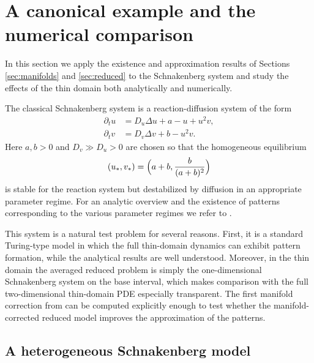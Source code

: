 \documentclass[11pt]{article}
\theoremstyle{definition}
\theoremstyle{remark}
\numberwithin{equation}{section}
\begin{document}
\section{A canonical example and the numerical comparison}\label{sec:example}

In this section we apply the existence and approximation results of Sections \ref{sec:manifolds} and \ref{sec:reduced} to the Schnakenberg system and study the effects of the thin domain both analytically and numerically.

The classical Schnakenberg system \cite{schnakenberg1979simple,maini1997spatial} is a reaction-diffusion system of the form 
\begin{equation}\label{eq:schnak}
\begin{aligned}
\partial_t u &= D_u\Delta u + a-u+u^2v,\\
\partial_t v &= D_v\Delta v + b-u^2v.
\end{aligned}
\end{equation}
Here $a,b>0$ and $D_v\gg D_u>0$ are chosen so that the homogeneous equilibrium
\[
(u_*,v_*)=\Bigl(a+b,\frac{b}{(a+b)^2}\Bigr)
\]
is stable for the reaction system but destabilized by diffusion in an appropriate parameter regime.
For an analytic overview and the existence of patterns corresponding to the various parameter regimes we refer to \cite{ward2002existence,iron2004stability}.

This system is a natural test problem for several reasons.
First, it is a standard Turing-type model in which the full thin-domain dynamics can exhibit pattern formation, while the analytical results are well understood.
Moreover, in the thin domain the averaged reduced problem is simply the one-dimensional Schnakenberg system on the base interval, which makes comparison with the full two-dimensional thin-domain PDE especially transparent.
The first manifold correction from  can be computed explicitly enough to test whether the manifold-corrected reduced model improves the approximation of the patterns.


\subsection{A heterogeneous Schnakenberg model}\label{subsec:transverse-schnakenberg}
\end{document}
